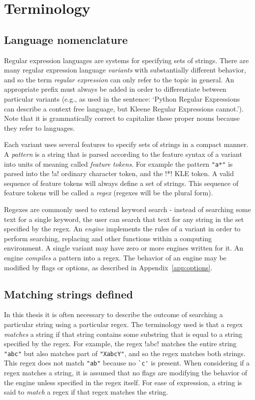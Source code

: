 \section{Terminology}

\subsection{Language nomenclature}
\label{sec:nomenclature}
Regular expression languages are systems for specifying sets of strings.  There are many regular expression language \emph{variants} with substantially different behavior, and so the term \emph{regular expression} can only refer to the topic in general.  An appropriate prefix must always be added in order to differentiate between particular variants (e.g., as used in the sentence:  `Python Regular Expressions can describe a context free language, but Kleene Regular Expressions cannot.').  Note that it is grammatically correct to capitalize these proper nouns because they refer to languages.

Each variant uses several features to specify sets of strings in a compact manner.  A \emph{pattern} is a string that is parsed according to the feature syntax of a variant into units of meaning called \emph{feature tokens}.  For example the pattern \verb!"a*"! is parsed into the \bverb!a! ordinary character token, and the \bverb!*! KLE token.  A valid sequence of feature tokens will always define a set of strings.  This sequence of feature tokens will be called a \emph{regex} (regexes will be the plural form).

Regexes are commonly used to extend keyword search - instead of searching some text for a single keyword, the user can search that text for any string in the set specified by the regex.   An \emph{engine} implements the rules of a variant in order to perform searching, replacing and other functions within a computing environment.  A single variant may have zero or more engines written for it.  An engine \emph{compiles} a pattern into a regex.  The behavior of an engine may be modified by flags or options, as described in Appendix~\ref{app:options}.

\subsection{Matching strings defined}
\label{sec:matchingDefined}
In this thesis it is often necessary to describe the outcome of searching a particular string using a particular regex.  The terminology used is that a regex \emph{matches} a string if that string contains some substring that is equal to a string specified by the regex.  For example, the regex \cverb!abc! matches the entire string \verb!"abc"! but also matches part of \verb!"XabcY"!, and so the regex matches both strings.  This regex does not match \verb!"ab"! because no \verb!`c'! is present.  When considering if a regex matches a string, it is assumed that no flags are modifying the behavior of the engine unless specified in the regex itself.  For ease of expression, a string is said to \emph{match} a regex if that regex matches the string.

